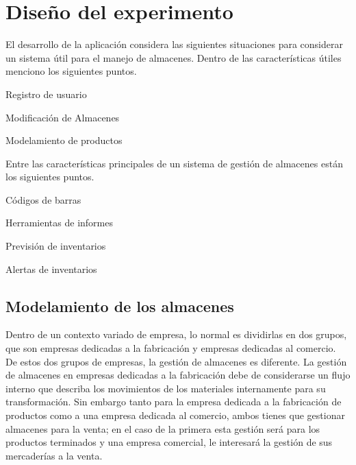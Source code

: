 

\chapter{Diseño del experimento}

El desarrollo de la aplicación considera las siguientes situaciones para considerar un sistema útil para el manejo de almacenes. Dentro de las características útiles menciono los siguientes puntos.

\begin{numerate}
\item Registro de usuario
\item Modificación de Almacenes
\item Modelamiento de productos
\end{numerate}

Entre las características principales de un sistema de gestión de almacenes están los siguientes puntos.

\begin{numerate}
\item Códigos de barras
\item Herramientas de informes
\item Previsión de inventarios
\item Alertas de inventarios
\end{numerate}

\section{Modelamiento de los almacenes}

Dentro de un contexto variado de empresa, lo normal es dividirlas en dos grupos, que son empresas dedicadas a la fabricación y empresas dedicadas al comercio. De estos dos grupos de empresas, la gestión de almacenes es diferente. La gestión de almacenes en empresas dedicadas a la fabricación debe de considerarse un flujo interno que describa los movimientos de los materiales internamente para su transformación. Sin embargo tanto para la empresa dedicada a la fabricación de productos como a una empresa dedicada al comercio, ambos tienes que gestionar almacenes para la venta; en el caso de la primera esta gestión será para los productos terminados y una empresa comercial, le interesará la gestión de sus mercaderías a la venta.\\

